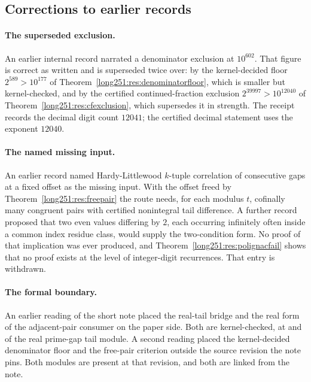 \documentclass[11pt]{article}
\begin{document}
\subsection{Corrections to earlier records}\label{long251:sec:xr-corrections}

\paragraph{The superseded exclusion.}  An earlier internal record narrated a
denominator exclusion at $10^{602}$.  That figure is correct as written and is
superseded twice over: by the kernel-decided floor $2^{589}>10^{177}$ of
Theorem~\ref{long251:res:denominatorfloor}, which is smaller but kernel-checked, and by
the certified continued-fraction exclusion $2^{39997}>10^{12040}$ of
Theorem~\ref{long251:res:cfexclusion}, which supersedes it in strength.  The receipt
records the decimal digit count $12041$; the certified decimal statement uses
the exponent $12040$.

\paragraph{The named missing input.}  An earlier record named
Hardy-Littlewood $k$-tuple correlation of consecutive gaps at a fixed offset as
the missing input.  With the offset freed by Theorem~\ref{long251:res:freepair} the
route needs, for each modulus $t$, cofinally many congruent pairs with
certified nonintegral tail difference.  A further record proposed that two even
values differing by $2$, each occurring infinitely often inside a common index
residue class, would supply the two-condition form.  No proof of that
implication was ever produced, and Theorem~\ref{long251:res:polignacfail} shows that no
proof exists at the level of integer-digit recurrences.  That entry is
withdrawn.

\paragraph{The formal boundary.}  An earlier reading of the short note placed
the real-tail bridge and the real form of the adjacent-pair consumer on the
paper side.  Both are kernel-checked, at
and
of the real prime-gap tail module.  A second reading placed the kernel-decided
denominator floor and the free-pair criterion outside the source revision the
note pins.  Both modules are present at that revision, and both are linked from
the note.
\end{document}
